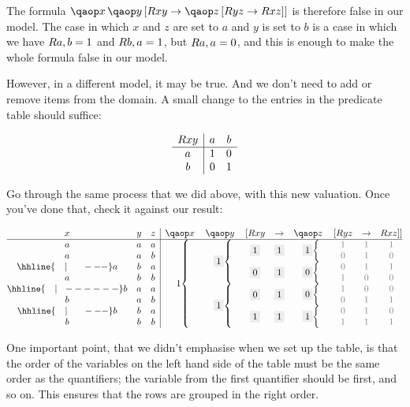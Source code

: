 \documentclass[PHIL101-Textbook.tex]{subfiles}
\begin{document}
\noindent The formula $\qa{x}{\qab{y}{\atom R {xy} \eif \qab{z}{\atom R {yz}\eif \atom R{xz}}}}$ is therefore false in our model. The case in which $x$ and $z$ are set to $a$ and $y$ is set to $b$ is a case in which we have $\mathord{R}{a,b} = 1$ and $\mathord{R}{b,a} = 1$, but $\mathord{R}{a,a} = 0$, and this is enough to make the whole formula false in our model. 


However, in a different model, it may be true. And we don't need to add or remove items from the domain. A small change to the entries in the predicate table should suffice:

\[\begin{array}{c|cc}
  \mathord{R}{xy} & a & b \\ \hline
  a & 1 & 0   \\
  b & 0 & 1\\
\end{array}\]

\noindent Go through the same process that we did above, with this new valuation. Once you've done that, check it against our result:

\[
\begin{array}{@{}ccc|cccccccc@{}}
  x & y & z & \qa x & \qa y & [\atom R {xy} & \eif & \qa z & [\atom R {yz} & \eif & \atom R {xz}]]\\ \hline
  a & a & a &\brax{8}{\vT} &\brax{4}{\GT}&\mrow{2}{\GT}&\mrow{2}{\GT}&\brax{2}{\GT}& \gT & \gT & \gT \\
  a & a & b & &&  &&& \gF & \gT & \gF \\
				\hhline{~~~|~~~~~---}
  a & b & a & &&\mrow{2}{\GF}&\mrow{2}{\GT}&\brax{2}{\GF}& \gF & \gT & \gT \\
  a & b & b & &&  &&& \gT & \gF & \gF \\
				\hhline{~~~|~~------}
  b & a & a & &\brax{4}{\GT}&\mrow{2}{\GF}&\mrow{2}{\GT}&\brax{2}{\GF}& \gT & \gF & \gF \\
  b & a & b & &&  &&& \gF & \gT & \gT \\
				\hhline{~~~|~~~~~---}
  b & b & a & &&\mrow{2}{\GT}&\mrow{2}{\GT}&\brax{2}{\GT}& \gF & \gT & \gF \\
  b & b & b & &&  &&& \gT & \gT & \gT \\\end{array}
\]

One important point, that we didn't emphasise when we set up the table, is that the order of the variables on the left hand side of the table must be the same order as the quantifiers; the variable from the first quantifier should be first, and so on. This ensures that the rows are grouped in the right order. %
\end{document}
